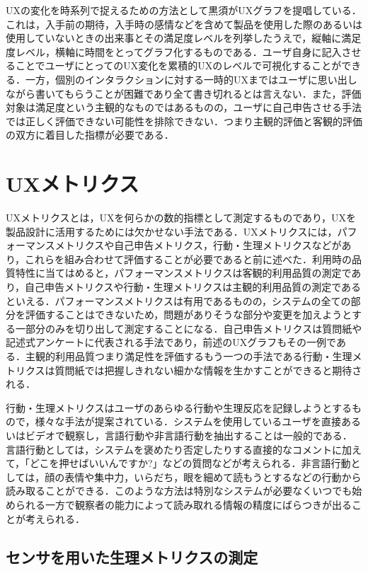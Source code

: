UXの変化を時系列で捉えるための方法として黒須がUXグラフ\cite{kurosu2015}を提唱している．これは，入手前の期待，入手時の感情などを含めて製品を使用した際のあるいは使用していないときの出来事とその満足度レベルを列挙したうえで，縦軸に満足度レベル，横軸に時間をとってグラフ化するものである．ユーザ自身に記入させることでユーザにとってのUX変化を累積的UXのレベルで可視化することができる．一方，個別のインタラクションに対する一時的UXまではユーザに思い出しながら書いてもらうことが困難であり全て書き切れるとは言えない．また，評価対象は満足度という主観的なものではあるものの，ユーザに自己申告させる手法では正しく評価できない可能性を排除できない．つまり主観的評価と客観的評価の双方に着目した指標が必要である．

\section{UXメトリクス}

UXメトリクスとは，UXを何らかの数的指標として測定するものであり，UXを製品設計に活用するためには欠かせない手法である．UXメトリクスには，パフォーマンスメトリクスや自己申告メトリクス，行動・生理メトリクスなどがあり\cite{tullis2014}，これらを組み合わせて評価することが必要であると前に述べた．利用時の品質特性に当てはめると，パフォーマンスメトリクスは客観的利用品質の測定であり，自己申告メトリクスや行動・生理メトリクスは主観的利用品質の測定であるといえる．パフォーマンスメトリクスは有用であるものの，システムの全ての部分を評価することはできないため，問題がありそうな部分や変更を加えようとする一部分のみを切り出して測定することになる．自己申告メトリクスは質問紙や記述式アンケートに代表される手法であり，前述のUXグラフもその一例である．主観的利用品質つまり満足性を評価するもう一つの手法である行動・生理メトリクスは質問紙では把握しきれない細かな情報を生かすことができると期待される．

行動・生理メトリクスはユーザのあらゆる行動や生理反応を記録しようとするもので，様々な手法が提案されている．システムを使用しているユーザを直接あるいはビデオで観察し，言語行動や非言語行動を抽出することは一般的である．
言語行動としては，システムを褒めたり否定したりする直接的なコメントに加えて，「どこを押せばいいんですか?」などの質問などが考えられる．非言語行動としては，顔の表情や集中力，いらだち，眼を細めて読もうとするなどの行動から読み取ることができる．このような方法は特別なシステムが必要なくいつでも始められる一方で観察者の能力によって読み取れる情報の精度にばらつきが出ることが考えられる．

\subsection{センサを用いた生理メトリクスの測定}

